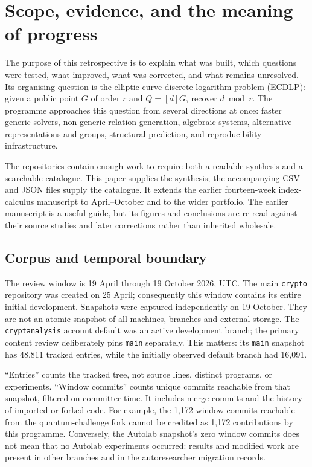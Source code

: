 \section{Scope, evidence, and the meaning of progress}\label{sec:scope}

The purpose of this retrospective is to explain what was built, which
questions were tested, what improved, what was corrected, and what remains
unresolved. Its organising question is the elliptic-curve discrete
logarithm problem (ECDLP): given a public point $G$ of order $r$ and
$Q=[d]G$, recover $d\bmod r$. The programme approaches this question from
several directions at once: faster generic solvers, non-generic relation
generation, algebraic systems, alternative representations and groups,
structural prediction, and reproducibility infrastructure.

The repositories contain enough work to require both a readable synthesis
and a searchable catalogue. This paper supplies the synthesis; the
accompanying CSV and JSON files supply the catalogue. It extends the
earlier fourteen-week index-calculus manuscript to April--October and to
the wider portfolio. The earlier manuscript is a useful guide, but its
figures and conclusions are re-read against their source studies and later
corrections rather than inherited wholesale.

\subsection{Corpus and temporal boundary}

The review window is 19 April through 19 October 2026, UTC. The main
\texttt{crypto} repository was created on 25 April; consequently this
window contains its entire initial development. Snapshots were captured
independently on 19 October. They are not an atomic snapshot of all
machines, branches and external storage. The \texttt{cryptanalysis}
account default was an active development branch; the primary content
review deliberately pins \texttt{main} separately. This matters: its
\texttt{main} snapshot has 48,811 tracked entries, while the initially
observed default branch had 16,091.



``Entries'' counts the tracked tree, not source lines, distinct programs,
or experiments. ``Window commits'' counts unique commits reachable from
that snapshot, filtered on committer time. It includes merge commits and
the history of imported or forked code. For example, the 1,172 window
commits reachable from the quantum-challenge fork cannot be credited as
1,172 contributions by this programme. Conversely, the Autolab snapshot's
zero window commits does not mean that no Autolab experiments occurred:
results and modified work are present in other branches and in the
autoresearcher migration records.

